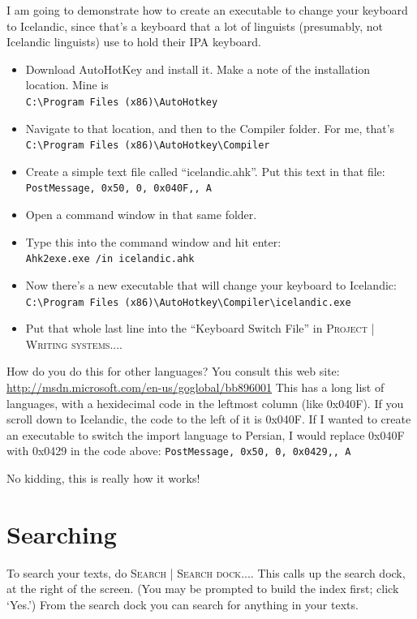 \documentclass[oneside]{book}
\def\menu#1{\textsc{#1}}
\def\menu#1#2{\textsc{#1 | #2}}
\begin{document}
I am going to demonstrate how to create an executable to change your keyboard to Icelandic, since that's a keyboard that a lot of linguists (presumably, not Icelandic linguists) use to hold their IPA keyboard.

\begin{itemize}
\item Download AutoHotKey and install it. Make a note of the installation location. Mine is \\ \verb+C:\Program Files (x86)\AutoHotkey+
\item Navigate to that location, and then to the Compiler folder. For me, that's\\ \verb+C:\Program Files (x86)\AutoHotkey\Compiler+
\item Create a simple text file called ``icelandic.ahk''. Put this text in that file:\\ \verb+PostMessage, 0x50, 0, 0x040F,, A+
\item Open a command window in that same folder.
\item Type this into the command window and hit enter:\\
\verb+Ahk2exe.exe /in icelandic.ahk+
\item Now there's a new executable that will change your keyboard to Icelandic:\\
\verb+C:\Program Files (x86)\AutoHotkey\Compiler\icelandic.exe+
\item Put that whole last line into the ``Keyboard Switch File''  in \menu{Project}{Writing systems...}.
\end{itemize}

How do you do this for other languages? You consult this web site: \url{http://msdn.microsoft.com/en-us/goglobal/bb896001} This has a long list of languages, with a hexidecimal code in the leftmost column (like 0x040F). If you scroll down to Icelandic, the code to the left of it is 0x040F. If I wanted to create an executable to switch the import language to Persian, I would replace 0x040F with 0x0429 in the code above: \verb+PostMessage, 0x50, 0, 0x0429,, A+

No kidding, this is really how it works!

\section{Searching}
To search your texts, do \menu{Search}{Search dock...}. This calls up the search dock, at the right of the screen. (You may be prompted to build the index first; click `Yes.') From the search dock you can search for anything in your texts.
\end{document}
